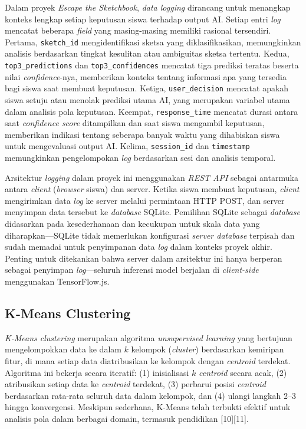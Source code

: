 Dalam proyek \textit{Escape the Sketchbook}, \textit{data logging} dirancang untuk menangkap konteks lengkap setiap keputusan siswa terhadap output AI. Setiap entri \textit{log} mencatat beberapa \textit{field} yang masing-masing memiliki rasional tersendiri. Pertama, \texttt{sketch\_id} mengidentifikasi sketsa yang diklasifikasikan, memungkinkan analisis berdasarkan tingkat kesulitan atau ambiguitas sketsa tertentu. Kedua, \texttt{top3\_predictions} dan \texttt{top3\_confidences} mencatat tiga prediksi teratas beserta nilai \textit{confidence}-nya, memberikan konteks tentang informasi apa yang tersedia bagi siswa saat membuat keputusan. Ketiga, \texttt{user\_decision} mencatat apakah siswa setuju atau menolak prediksi utama AI, yang merupakan variabel utama dalam analisis pola keputusan. Keempat, \texttt{response\_time} mencatat durasi antara saat \textit{confidence score} ditampilkan dan saat siswa mengambil keputusan, memberikan indikasi tentang seberapa banyak waktu yang dihabiskan siswa untuk mengevaluasi output AI. Kelima, \texttt{session\_id} dan \texttt{timestamp} memungkinkan pengelompokan \textit{log} berdasarkan sesi dan analisis temporal.

Arsitektur \textit{logging} dalam proyek ini menggunakan \textit{REST API} sebagai antarmuka antara \textit{client} (\textit{browser} siswa) dan server. Ketika siswa membuat keputusan, \textit{client} mengirimkan data \textit{log} ke server melalui permintaan HTTP POST, dan server menyimpan data tersebut ke \textit{database} SQLite. Pemilihan SQLite sebagai \textit{database} didasarkan pada kesederhanaan dan kecukupan untuk skala data yang diharapkan—SQLite tidak memerlukan konfigurasi \textit{server database} terpisah dan sudah memadai untuk penyimpanan data \textit{log} dalam konteks proyek akhir. Penting untuk ditekankan bahwa server dalam arsitektur ini hanya berperan sebagai penyimpan \textit{log}—seluruh inferensi model berjalan di \textit{client-side} menggunakan TensorFlow.js.

\subsection{K-Means Clustering}
\label{subsec:kmeans}

\textit{K-Means clustering} merupakan algoritma \textit{unsupervised learning} yang bertujuan mengelompokkan data ke dalam $k$ kelompok (\textit{cluster}) berdasarkan kemiripan fitur, di mana setiap data diatribusikan ke kelompok dengan \textit{centroid} terdekat. Algoritma ini bekerja secara iteratif: (1) inisialisasi $k$ \textit{centroid} secara acak, (2) atribusikan setiap data ke \textit{centroid} terdekat, (3) perbarui posisi \textit{centroid} berdasarkan rata-rata seluruh data dalam kelompok, dan (4) ulangi langkah 2--3 hingga konvergensi. Meskipun sederhana, K-Means telah terbukti efektif untuk analisis pola dalam berbagai domain, termasuk pendidikan [10][11].

